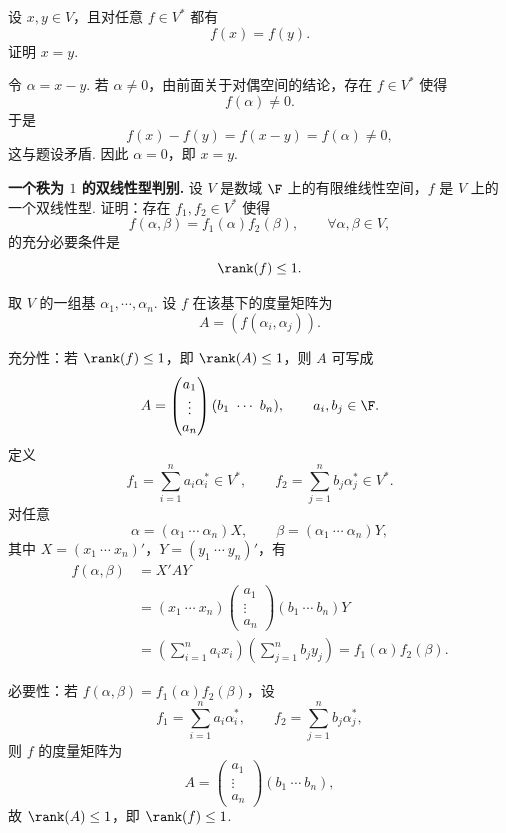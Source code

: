 \begin{problem}
	设 $x,y\in V$，且对任意 $f\in V^*$ 都有
	\[
	f(x)=f(y).
	\]
	证明 $x=y$.
\end{problem}

\begin{solution}
	令 $\alpha=x-y$. 若 $\alpha\ne0$，由前面关于对偶空间的结论，存在 $f\in V^*$ 使得
	\[
	f(\alpha)\ne0.
	\]
	于是
	\[
	f(x)-f(y)=f(x-y)=f(\alpha)\ne0,
	\]
	这与题设矛盾. 因此 $\alpha=0$，即 $x=y$.
\end{solution}

\begin{problem}
	\textbf{一个秩为 $1$ 的双线性型判别.}
	设 $V$ 是数域 $\F$ 上的有限维线性空间，$f$ 是 $V$ 上的一个双线性型. 证明：存在 $f_1,f_2\in V^*$ 使得
	\[
	f(\alpha,\beta)=f_1(\alpha)f_2(\beta),
	\qquad \forall \alpha,\beta\in V,
	\]
	的充分必要条件是
	\[
	\rank(f)\le 1.
	\]
\end{problem}

\begin{solution}
	取 $V$ 的一组基 $\alpha_1,\cdots,\alpha_n$. 设 $f$ 在该基下的度量矩阵为
	\[
	A=(f(\alpha_i,\alpha_j)).
	\]
	
	充分性：若 $\rank(f)\le1$，即 $\rank(A)\le1$，则 $A$ 可写成
	\[
	A=\begin{pmatrix}
		a_1\\ \vdots\\ a_n
	\end{pmatrix}
	(b_1\ \cdots\ b_n),
	\qquad a_i,b_j\in\F.
	\]
	定义
	\[
	f_1=\sum_{i=1}^n a_i\alpha_i^*\in V^*,
	\qquad
	f_2=\sum_{j=1}^n b_j\alpha_j^*\in V^*.
	\]
	对任意
	\[
	\alpha=(\alpha_1\ \cdots\ \alpha_n)X,
	\qquad
	\beta=(\alpha_1\ \cdots\ \alpha_n)Y,
	\]
	其中 $X=(x_1\ \cdots\ x_n)'$，$Y=(y_1\ \cdots\ y_n)'$，有
	\[
	\begin{aligned}
		f(\alpha,\beta)
		&=X'AY \\
		&=(x_1\ \cdots\ x_n)
		\begin{pmatrix}
			a_1\\ \vdots\\ a_n
		\end{pmatrix}
		(b_1\ \cdots\ b_n)Y \\
		&=\left(\sum_{i=1}^n a_ix_i\right)
		\left(\sum_{j=1}^n b_jy_j\right)
		=f_1(\alpha)f_2(\beta).
	\end{aligned}
	\]
	
	必要性：若 $f(\alpha,\beta)=f_1(\alpha)f_2(\beta)$，设
	\[
	f_1=\sum_{i=1}^n a_i\alpha_i^*,
	\qquad
	f_2=\sum_{j=1}^n b_j\alpha_j^*,
	\]
	则 $f$ 的度量矩阵为
	\[
	A=\begin{pmatrix}
		a_1\\ \vdots\\ a_n
	\end{pmatrix}
	(b_1\ \cdots\ b_n),
	\]
	故 $\rank(A)\le1$，即 $\rank(f)\le1$.
\end{solution}

